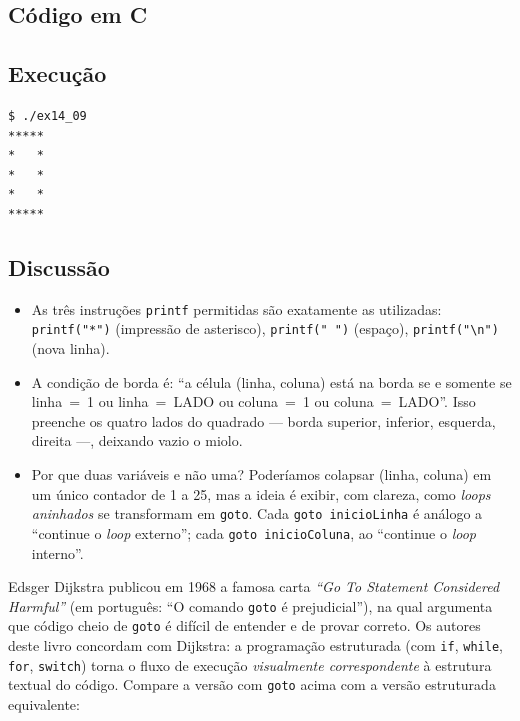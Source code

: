 \documentclass[11pt,a4paper]{article}
\begin{document}
\subsection*{C\'odigo em C}



\subsection*{Execu\c{c}\~ao}

\begin{saidabox}
\begin{lstlisting}[style=terminal]
$ ./ex14_09
*****
*   *
*   *
*   *
*****
\end{lstlisting}
\end{saidabox}

\subsection*{Discuss\~ao}

\begin{itemize}[leftmargin=*]
  \item As tr\^es instru\c{c}\~oes \texttt{printf} permitidas s\~ao exatamente as utilizadas: \texttt{printf("*")} (impress\~ao de asterisco), \texttt{printf(" ")} (espa\c{c}o), \texttt{printf("\textbackslash n")} (nova linha).
  \item A condi\c{c}\~ao de borda \'e: ``a c\'elula (linha, coluna) est\'a na borda se e somente se linha~=~1 ou linha~=~LADO ou coluna~=~1 ou coluna~=~LADO''. Isso preenche os quatro lados do quadrado --- borda superior, inferior, esquerda, direita ---, deixando vazio o miolo.
  \item Por que duas vari\'aveis e n\~ao uma? Poder\'iamos colapsar (linha, coluna) em um \'unico contador de 1 a 25, mas a ideia \'e exibir, com clareza, como \emph{loops aninhados} se transformam em \texttt{goto}. Cada \texttt{goto inicioLinha} \'e an\'alogo a ``continue o \emph{loop} externo''; cada \texttt{goto inicioColuna}, ao ``continue o \emph{loop} interno''.
\end{itemize}

\begin{obseng}
Edsger Dijkstra publicou em 1968 a famosa carta \emph{``Go To Statement Considered Harmful''} (em portugu\^es: ``O comando \texttt{goto} \'e prejudicial''), na qual argumenta que c\'odigo cheio de \texttt{goto} \'e dif\'icil de entender e de provar correto. Os autores deste livro concordam com Dijkstra: a programa\c{c}\~ao estruturada (com \texttt{if}, \texttt{while}, \texttt{for}, \texttt{switch}) torna o fluxo de execu\c{c}\~ao \emph{visualmente correspondente} \`a estrutura textual do c\'odigo. Compare a vers\~ao com \texttt{goto} acima com a vers\~ao estruturada equivalente:
\end{obseng}
\end{document}
